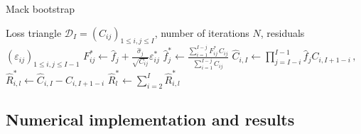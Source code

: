 \documentclass[a4paper]{book}
\theoremstyle{plain}
\begin{document}
\begin{algorithm}
    \caption{Mack bootstrap}
    \begin{algorithmic}
        \Require Loss triangle $\mathcal{D}_I = (C_{ij})_{1 \leq i, j \leq I}$, number of iterations $N$, residuals $(\varepsilon_{ij})_{1 \leq i, j \leq I - 1}$
        \vspace{2pt}
        \vspace{2pt}
                        \vspace{4pt}
                        \State $\displaystyle F^*_{ij} \gets \hat{f}_j + \frac{\hat{\sigma}_j}{\sqrt{C_{ij}}} \varepsilon^*_{ij}$
                        \vspace{4pt}
                    \EndFor
                    \vspace{4pt}
                        \State $\displaystyle \hat{f}^*_j \gets \frac{\sum_{i = 1}^{I - j}F^*_{ij} \, C_{ij}}{\sum_{i = 1}^{I - j} C_{ij}}$
                    \vspace{4pt}
                \EndFor
                \vspace{3pt}
                \State $\hat{C}_{i, I} \gets \prod_{j = I - i}^{I - 1} \hat{f}_j C_{i, I + 1 - i} \,,$
                \vspace{2pt}
                \State $\hat{R}^*_{i, l} \gets \hat{C}_{i, I} - C_{i, I + 1 - i}$
                \vspace{3pt}
            \EndFor
            \vspace{2pt}
            \State $\hat{R}^*_l \gets \sum_{i = 2}^I \hat{R}^*_{i, l}$
            \vspace{2pt}
        \EndFor
    \end{algorithmic}
\end{algorithm}

\subsection{Numerical implementation and results}
\end{document}
